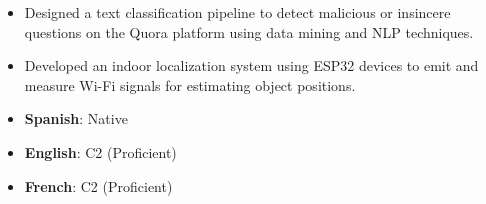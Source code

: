 \begin{itemize}
    \item Designed a text classification pipeline to detect malicious or insincere questions on the Quora platform using data mining and NLP techniques.
\end{itemize}

\begin{itemize}
    \item Developed an indoor localization system using ESP32 devices to emit and measure Wi-Fi signals for estimating object positions.
\end{itemize}


{\LaTeXraggedright
{}
\par}

\begin{itemize}
    \item \textbf{Spanish}: Native
    \item \textbf{English}: C2 (Proficient)
    \item \textbf{French}: C2 (Proficient)
\end{itemize}
